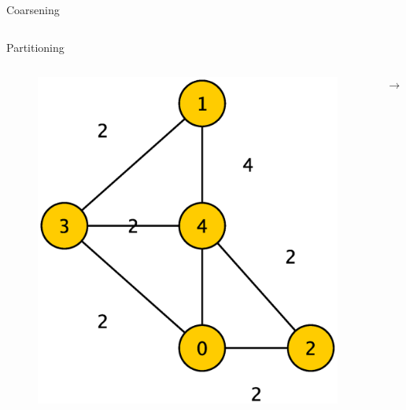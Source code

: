\documentclass{beamer}
\begin{document}
\begin{frame}{Coarsening}
\begin{columns}[c]
  \end{columns}
\end{frame}



\begin{frame}{Partitioning}
  \begin{columns}[c]
    \scriptsize
    \begin{center}
      \begin{figure}[htbp]
        \includegraphics[scale=.15]{img/coarsening2.eps}
      \end{figure}
    \end{center}

    \begin{center}
      $\longrightarrow$  
    \end{center}    
    

\end{columns}
\end{frame}
\end{document}

